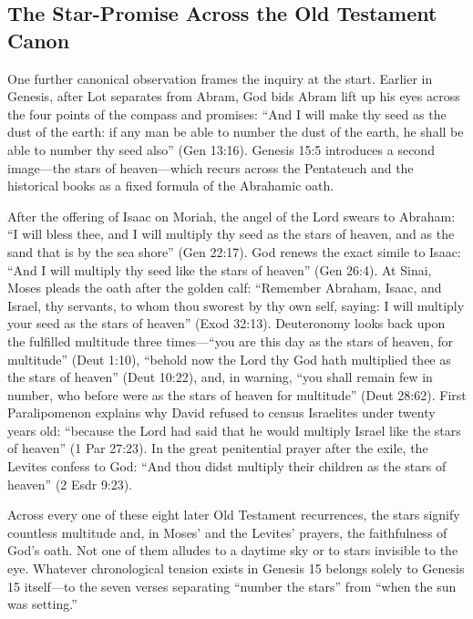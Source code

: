 \subsection{The Star-Promise Across the Old Testament Canon}

One further canonical observation frames the inquiry at the start. Earlier in Genesis, after Lot separates from Abram, God bids Abram lift up his eyes across the four points of the compass and promises: ``And I will make thy seed as the dust of the earth: if any man be able to number the dust of the earth, he shall be able to number thy seed also'' (Gen 13:16). Genesis 15:5 introduces a second image---the stars of heaven---which recurs across the Pentateuch and the historical books as a fixed formula of the Abrahamic oath.

After the offering of Isaac on Moriah, the angel of the Lord swears to Abraham: ``I will bless thee, and I will multiply thy seed as the stars of heaven, and as the sand that is by the sea shore'' (Gen 22:17). God renews the exact simile to Isaac: ``And I will multiply thy seed like the stars of heaven'' (Gen 26:4). At Sinai, Moses pleads the oath after the golden calf: ``Remember Abraham, Isaac, and Israel, thy servants, to whom thou sworest by thy own self, saying: I will multiply your seed as the stars of heaven'' (Exod 32:13). Deuteronomy looks back upon the fulfilled multitude three times---``you are this day as the stars of heaven, for multitude'' (Deut 1:10), ``behold now the Lord thy God hath multiplied thee as the stars of heaven'' (Deut 10:22), and, in warning, ``you shall remain few in number, who before were as the stars of heaven for multitude'' (Deut 28:62). First Paralipomenon explains why David refused to census Israelites under twenty years old: ``because the Lord had said that he would multiply Israel like the stars of heaven'' (1 Par 27:23). In the great penitential prayer after the exile, the Levites confess to God: ``And thou didst multiply their children as the stars of heaven'' (2 Esdr 9:23).

Across every one of these eight later Old Testament recurrences, the stars signify countless multitude and, in Moses' and the Levites' prayers, the faithfulness of God's oath. Not one of them alludes to a daytime sky or to stars invisible to the eye. Whatever chronological tension exists in Genesis 15 belongs solely to Genesis 15 itself---to the seven verses separating ``number the stars'' from ``when the sun was setting.''
